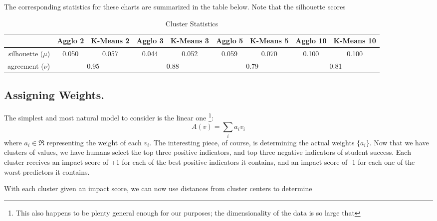 \documentclass[paper.tex]{subfiles}
\begin{document}
	The corresponding statistics for these charts are summarized in the table below. Note that the silhouette scores 
	
	\begin{table}[!h]
		\caption{Cluster Statistics}
		\def\arraystretch{1.2}%
		\begin{tabular}{r||cc|cc|cc|cc|}
			 &\small Agglo 2 &\small K-Means 2 &\small Agglo 3 &\small K-Means 3 &\small Agglo 5 &\small  K-Means 5 &\small Agglo 10 &\small K-Means 10\\\hline
		\small silhouette ($\mu$)& 0.050 & 0.057 & 0.044 & 0.052 & 0.059 & 0.070 & 0.100 & 0.100 \\
		\small agreement ($\nu$)  & \multicolumn{2}{|c|}{0.95} & \multicolumn{2}{|c|}{0.88} & \multicolumn{2}{|c|}{0.79}& \multicolumn{2}{|c|}{0.81}\\\hline
		\end{tabular}		\label{t1}
	\end{table}
		
	\subsection{Assigning Weights.}
	The simplest and most natural model to consider is the linear one \footnote{This also happens to be plenty general enough for our purposes; the dimensionality of the data is so large that }:
	\[A(v) = \sum_i a_i v_i \]
	where $a_i \in \Re$ representing the weight of each $v_i$. The interesting piece, of course, is determining the actual weights $\{a_i\}$. Now that we have clusters of values, we have humans select the top three positive indicators, and top three negative indicators of student success. Each cluster receives an impact score of +1 for each of the best positive indicators it contains, and an impact score of -1 for each one of the worst predictors it contains. 
	
	With each cluster given an impact score, we can now use distances from cluster centers to determine 
	
	
	
\end{document}
